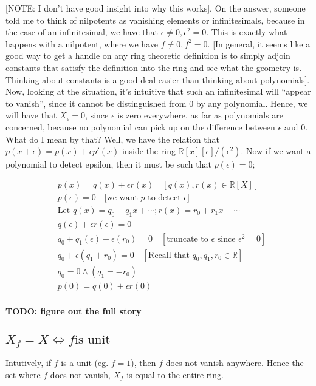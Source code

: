 \documentclass{book}
\theoremstyle{definition}
\begin{document}
[NOTE: I don't have good insight into
why this works]. On the answer, someone told me to think of nilpotents
as vanishing elements or infinitesimals, because in the case of an infinitesimal,
we have that $\epsilon \neq 0, \epsilon^2 = 0$. This is exactly what happens
with a nilpotent, where we have $f \neq 0, f^2 = 0$. [In general, it seems like
a good way to get a handle on any ring theoretic definition is to simply adjoin
constants that satisfy the definition into the ring and see what the geometry is.
Thinking about constants is a good deal easier than thinking about polynomials].
Now, looking at the situation, it's intuitive that such an infinitesimal will
``appear to vanish'', since it cannot be distinguished from $0$ by any
polynomial. Hence, we will have that $X_\epsilon = 0$, since $\epsilon$ is
zero everywhere, as far as polynomials are concerned, because no polynomial
can pick up on the difference between $\epsilon$ and $0$. What do I mean by
that? Well, we have the relation that $p(x + \epsilon) = p(x) + \epsilon p'(x)$
inside the ring $\mathbb R[x][\epsilon]/(\epsilon^2)$. Now if we
want a polynomial to detect epsilon, then it must be such that $p(\epsilon) = 0$;

\begin{align*}
  &p(x) = q(x) + \epsilon r(x) \quad [q(x), r(x) \in \mathbb R[X]] \\
  &p(\epsilon) = 0 \quad \text{[we want $p$ to detect $\epsilon$]} \\
  &\text{Let $q(x) = q_0 + q_1 x + \cdots; r(x) = r_0 + r_1 x + \cdots$ } \\
  &q(\epsilon) + \epsilon r(\epsilon) = 0 \\
  &q_0 + q_1(\epsilon) + \epsilon (r_0) = 0 \quad [\text{truncate to $\epsilon$ since $\epsilon^2 = 0$}] \\
  &q_0 + \epsilon(q_1 + r_0) = 0 \quad [\text{Recall that } q_0, q_1, r_0 \in \mathbb R] \\
  &q_0 = 0 \land (q_1 = - r_0) \\
  &p(0) = q(0) + \epsilon r(0) \\
\end{align*}

\textbf{TODO: figure out the full story}

\subsection{$X_f = X \iff f \text{is unit}$}

Intutively, if $f$ is a unit (eg. $f = 1$), then $f$ does not vanish anywhere. Hence the
set where $f$ does not vanish, $X_f$ is equal to the entire ring.
\end{document}
